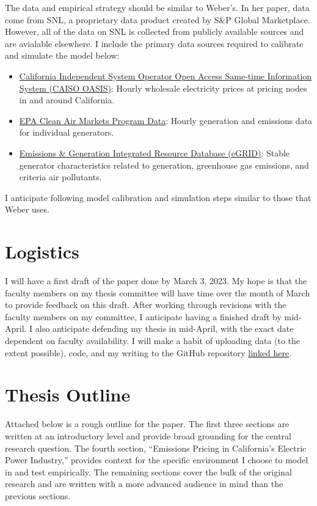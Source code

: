 \documentclass[11pt]{article}
\begin{document}
The data and empirical strategy should be similar to Weber's. In her paper, data come from SNL, a proprietary data product created by S\&P Global Marketplace. However, all of the data on SNL is collected from publicly available sources and are avialable elsewhere. I include the primary data sources required to calibrate and simulate the model below: 
\begin{itemize}
	\item \href{http://oasis.caiso.com/mrioasis/logon.do}{California Independent System Operator Open Access Same-time Information System (CAISO OASIS)}: Hourly wholesale electricity prices at pricing nodes in and around California.  
	\item \href{https://campd.epa.gov/data/bulk-data-files}{EPA Clean Air Markets Program Data}: Hourly generation and emissions data for individual generators. 
	\item \href{https://www.epa.gov/egrid}{Emissions \& Generation Integrated Resource Database (eGRID)}: Stable generator characteristics related to generation, greenhouse gas emissions, and criteria air pollutants.
\end{itemize}
I anticipate following model calibration and simulation steps similar to those that Weber uses. 

\section*{Logistics}

I will have a first draft of the paper done by March 3, 2023. My hope is that the faculty members on my thesis committee will have time over the month of March to provide feedback on this draft. After working through revisions with the faculty members on my committee, I anticipate having a finished draft by mid-April. I also anticipate defending my thesis in mid-April, with the exact date dependent on faculty availability. I will make a habit of uploading data (to the extent possible), code, and my writing to the GitHub repository \href{https://github.com/EAPerry/seniorThesis}{linked here}. 

\section*{Thesis Outline}

Attached below is a rough outline for the paper. The first three sections are written at an introductory level and provide broad grounding for the central research question. The fourth section, ``Emissions Pricing in California's Electric Power Industry,'' provides context for the specific environment I choose to model in and test empirically. The remaining sections cover the bulk of the original research and are written with a more advanced audience in mind than the previous sections. 
\end{document}
